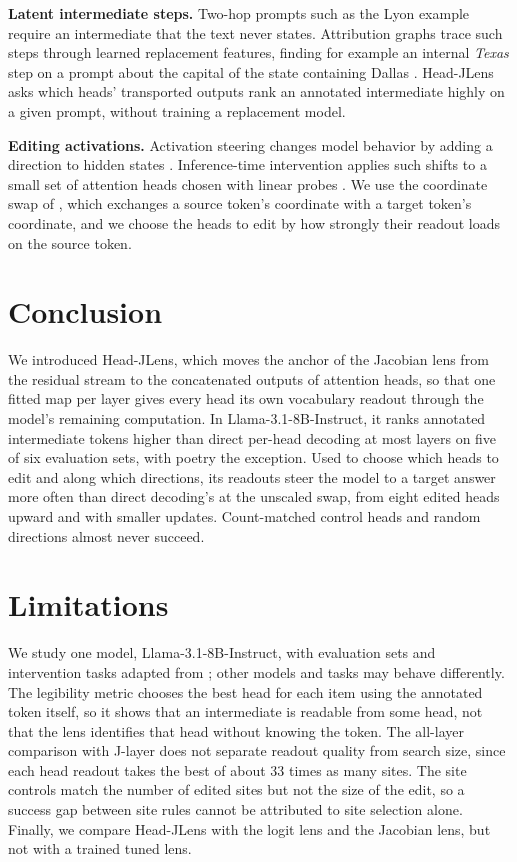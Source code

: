 \documentclass[11pt,a4paper]{article}
\begin{document}
\textbf{Latent intermediate steps.} Two-hop prompts such as the Lyon example require an intermediate that the text never states. Attribution graphs trace such steps through learned replacement features, finding for example an internal \emph{Texas} step on a prompt about the capital of the state containing Dallas \citep{lindsey2025}. Head-JLens asks which heads' transported outputs rank an annotated intermediate highly on a given prompt, without training a replacement model.

\textbf{Editing activations.} Activation steering changes model behavior by adding a direction to hidden states \citep{turner2023}. Inference-time intervention applies such shifts to a small set of attention heads chosen with linear probes \citep{li2023}. We use the coordinate swap of \citet{gurnee2026}, which exchanges a source token's coordinate with a target token's coordinate, and we choose the heads to edit by how strongly their readout loads on the source token.

\section{Conclusion}\label{sec:6}

We introduced Head-JLens, which moves the anchor of the Jacobian lens from the residual stream to the concatenated outputs of attention heads, so that one fitted map per layer gives every head its own vocabulary readout through the model's remaining computation. In Llama-3.1-8B-Instruct, it ranks annotated intermediate tokens higher than direct per-head decoding at most layers on five of six evaluation sets, with poetry the exception. Used to choose which heads to edit and along which directions, its readouts steer the model to a target answer more often than direct decoding's at the unscaled swap, from eight edited heads upward and with smaller updates. Count-matched control heads and random directions almost never succeed.

\section*{Limitations}

We study one model, Llama-3.1-8B-Instruct, with evaluation sets and intervention tasks adapted from \citet{gurnee2026}; other models and tasks may behave differently. The legibility metric chooses the best head for each item using the annotated token itself, so it shows that an intermediate is readable from some head, not that the lens identifies that head without knowing the token. The all-layer comparison with J-layer does not separate readout quality from search size, since each head readout takes the best of about 33 times as many sites. The site controls match the number of edited sites but not the size of the edit, so a success gap between site rules cannot be attributed to site selection alone. Finally, we compare Head-JLens with the logit lens and the Jacobian lens, but not with a trained tuned lens.
\end{document}

